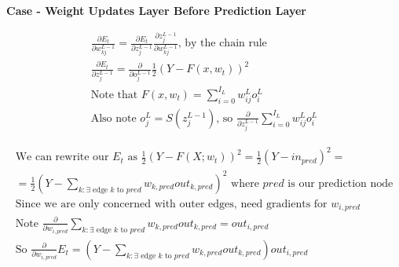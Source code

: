 \documentclass[11pt]{article}
\begin{document}
\vspace{5 mm}
\noindent
\textbf{Case - Weight Updates Layer Before Prediction Layer}

\begin{gather*}
\frac{\partial E_{t}}{\partial w_{kj}^{L - 1}} = 
\frac{\partial E_{t}}{\partial z_{j}^{L - 1}} 
\frac{\partial z_{j}^{L - 1}}{\partial w_{kj}^{L - 1}}
\text{, by the chain rule}\\
\frac{\partial E_{t}}{\partial z_{j}^{L - 1}} = 
\frac{\partial}{\partial o_{j}^{L - 1}} \frac{1}{2}(Y - F(x, w_{t}))^{2}\\
\text{Note that } F(x, w_{t}) = \sum_{i = 0}^{I_{L}} w_{ij}^{L} o_{i}^{L}\\
\text{Also note } o_{j}^{L} = S(z_{j}^{L - 1}) 
\text{, so } 
\frac{\partial}{\partial z_{j}^{L - 1}} 
\sum_{i = 0}^{I_{L}} w_{ij}^{L} o_{i}^{L}  
\end{gather*}



\begin{gather*}
\text{We can rewrite our } E_{t} \text{ as } 
\frac{1}{2}(Y - F(X; w_{t}))^{2} = 
\frac{1}{2}(Y - in_{pred})^{2} = \\
= \frac{1}{2}(Y - 
\sum_{k: \exists \text{ edge } k \text{ to } pred} w_{k,pred} out_{k,pred})^{2}
\text{ where } pred \text{ is our prediction node}\\
\text{Since we are only concerned with outer edges, need gradients for } 
w_{i, pred}\\
\text{Note } \frac{\partial}{\partial w_{i,pred}}
\sum_{k: \exists \text{ edge } k \text{ to } pred} w_{k,pred} out_{k,pred} = 
out_{i, pred}\\
\text{So } \frac{\partial}{\partial w_{i,pred}} E_{t} = 
(Y - \sum_{k: \exists \text{ edge } k \text{ to } pred} w_{k,pred} out_{k,pred})
out_{i, pred}
\end{gather*}
\end{document}

